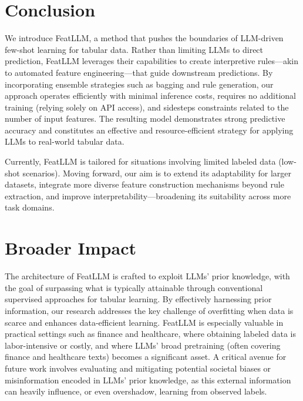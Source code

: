 \section{Conclusion}
We introduce \textsf{FeatLLM}, a method that pushes the boundaries of LLM-driven few-shot learning for tabular data. Rather than limiting LLMs to direct prediction, \textsf{FeatLLM} leverages their capabilities to create interpretive rules—akin to automated feature engineering—that guide downstream predictions. By incorporating ensemble strategies such as bagging and rule generation, our approach operates efficiently with minimal inference costs, requires no additional training (relying solely on API access), and sidesteps constraints related to the number of input features. The resulting model demonstrates strong predictive accuracy and constitutes an effective and resource-efficient strategy for applying LLMs to real-world tabular data.

Currently, \textsf{FeatLLM} is tailored for situations involving limited labeled data (low-shot scenarios). Moving forward, our aim is to extend its adaptability for larger datasets, integrate more diverse feature construction mechanisms beyond rule extraction, and improve interpretability—broadening its suitability across more task domains.

\section{Broader Impact}
The architecture of \textsf{FeatLLM} is crafted to exploit LLMs’ prior knowledge, with the goal of surpassing what is typically attainable through conventional supervised approaches for tabular learning. By effectively harnessing prior information, our research addresses the key challenge of overfitting when data is scarce and enhances data-efficient learning. \textsf{FeatLLM} is especially valuable in practical settings such as finance and healthcare, where obtaining labeled data is labor-intensive or costly, and where LLMs’ broad pretraining (often covering finance and healthcare texts) becomes a significant asset. A critical avenue for future work involves evaluating and mitigating potential societal biases or misinformation encoded in LLMs’ prior knowledge, as this external information can heavily influence, or even overshadow, learning from observed labels.

